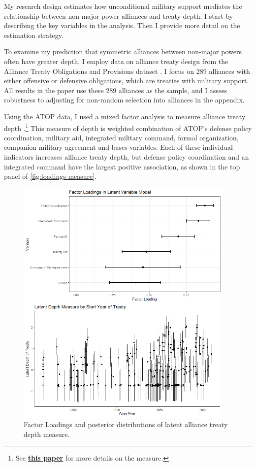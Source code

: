 \documentclass[12pt]{article}
\begin{document}
My research design estimates how unconditional military support mediates the relationship between non-major power alliances and treaty depth. 
I start by describing the key variables in the analysis. 
Then I provide more detail on the estimation strategy. 


To examine my prediction that symmetric alliances between non-major powers often have greater depth, I employ data on alliance treaty design from the Alliance Treaty Obligations and Provisions dataset \citep{Leedsetal2002}. 
I focus on 289 alliances with either offensive or defensive obligations, which are treaties with military support. 
All results in the paper use these 289 alliances as the sample, and I assess robustness to adjusting for non-random selection into alliances in the appendix. 


Using the ATOP data, I used a mixed factor analysis to measure alliance treaty depth \citep{Murrayetal2013}.\footnote{See \textbf{\href{https://github.com/joshuaalley/arms-allies/blob/master/manuscript/arms-allies-paper.pdf}{this paper}} for more details on the measure.}
This measure of depth is weighted combination of ATOP's defense policy coordination, military aid, integrated military command, formal organization, companion military agreement and bases variables. 
Each of these individual indicators increases alliance treaty depth, but defense policy coordination and an integrated command have the largest positive association, as shown in the top panel of \autoref{fig:loadings-measure}. 


\begin{figure}[hbtp]
\centering
\includegraphics[width=0.95\textwidth]{../figures/loadings-measure.png}
\caption{Factor Loadings and posterior distributions of latent alliance treaty depth measure.}
\label{fig:loadings-measure}
\end{figure}
\end{document}
